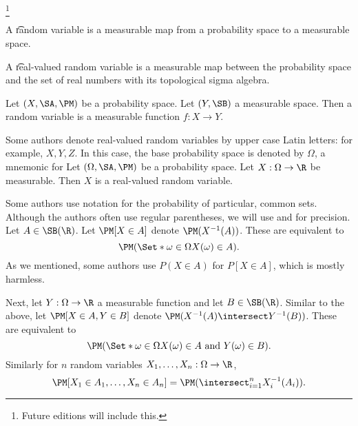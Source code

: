 
  \ifhmode\unskip\fi\footnote{
Future editions will include this.
  }


A \t{random variable} is a measurable map from a probability space to a measurable space.

A \t{real-valued random variable} is a measurable map between the probability space and the set of real numbers with its topological sigma algebra.


Let $(X, \SA, \PM)$ be a probability space.
Let $(Y, \SB)$ a measurable space.
Then a random variable is a measurable function $f: X \to Y$.

Some authors denote real-valued random variables by upper case Latin letters:
for example, $X, Y, Z$. In this case, the base probability space is denoted by $\Omega$, a mnemonic for 
Let $(\Omega,\SA,\PM)$ be a probability space.
Let $X: \Omega \to \R $ be measurable.
Then $X$ is a real-valued random variable.

Some authors use notation for the probability of particular, common sets.
Although the authors often use regular parentheses, we will use \say{$[$} and \say{$]$} for precision.
Let $A \in \SB(\R )$.
Let $\PM[X \in A]$ denote $\PM(X^{-1}(A))$.
These are equivalent to
  \[
\PM(\Set*{\omega  \in \Omega}{X(\omega ) \in A}).
  \]
As we mentioned, some authors use $P(X \in A)$ for $P[X \in A]$, which is mostly harmless.

Next, let $Y: \Omega \to \R $ a measurable function and let $B \in \SB(\R )$.
Similar to the above,
let $\PM[X \in A,Y \in B]$
denote $\PM(X^{-1}(A) \intersect Y^{-1}(B))$.
These are equivalent to
  \[
\PM(\Set*{\omega  \in \Omega}{X(\omega ) \in A \text{ and } Y(\omega ) \in B}).
  \]
Similarly for $n$ random variables $X_1, \dots, X_n: \Omega \to \R $,
  \[
\PM[X_1 \in A_1, \dots, X_n \in A_n] = \PM(\intersect_{i = 1}^{n} X_i^{-1}(A_i)).
  \]
